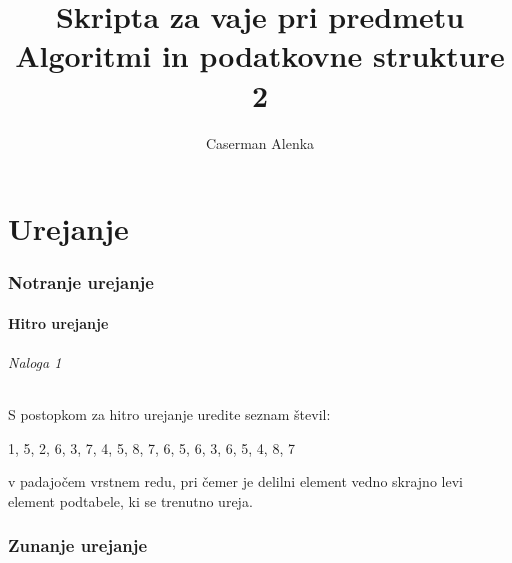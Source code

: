 \documentclass[a4paper,10pt]{scrartcl}
\title{Skripta za vaje pri predmetu Algoritmi in podatkovne strukture 2}
\author{Caserman Alenka}
\begin{document}
\maketitle

\tableofcontents

\part{Urejanje}

\section{Notranje urejanje}

\subsection{Hitro urejanje}

\paragraph*{Naloga 1}

S postopkom za hitro urejanje uredite seznam števil:\\
\begin{center}
	1, 5, 2, 6, 3, 7, 4, 5, 8, 7, 6, 5, 6, 3, 6, 5, 4, 8, 7
\end{center}
v padajočem vrstnem redu, pri čemer je delilni element vedno skrajno levi element podtabele, ki se trenutno ureja.

\section{Zunanje urejanje}
\end{document}
